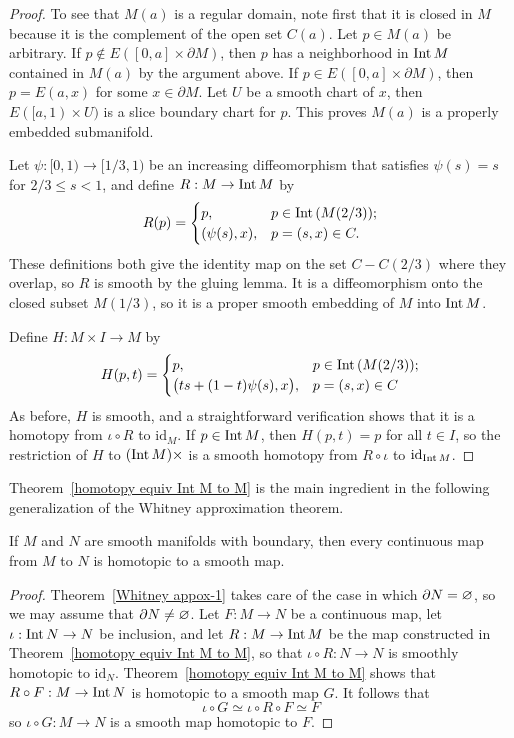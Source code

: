 \begin{proof}
To see that $M(a)$ is a regular domain, note first that it is closed in $M$ because it is the complement of the open set $C(a)$. Let $p\in M(a)$ be arbitrary. If $p\notin E([0,a]\times\partial M)$, then $p$ has a neighborhood in $\mathrm{Int}\, M$ contained in $M(a)$ by the argument above. If $p\in E([0,a]\times\partial M)$, then $p=E(a,x)$ for some $x\in\partial M$. Let $U$ be  a smooth chart of $x$, then $E([a,1)\times U)$ is a slice boundary chart for $p$. This proves $M(a)$ is a properly embedded submanifold.\par
Let $\psi:[0,1)\to [1/3,1)$ be an increasing diffeomorphism that satisfies $\psi(s)=s$ for $2/3\leq s<1$, and define $R:M\to\mathrm{Int}\, M$ by
\[R(p)=\begin{cases}
p,&p\in\mathrm{Int}\,(M(2/3));\\
(\psi(s),x),&p=(s,x)\in C.
\end{cases}\]
These definitions both give the identity map on the set $C-C(2/3)$ where they overlap, so $R$ is smooth by the gluing lemma. It is a diffeomorphism onto the closed subset $M(1/3)$, so it is a proper smooth embedding of $M$ into $\mathrm{Int}\, M$.\par
Define $H:M\times I\to M$ by
\[H(p,t)=\begin{cases}
p,&p\in\mathrm{Int}\,(M(2/3));\\
\big(ts+(1-t)\psi(s),x\big),&p=(s,x)\in C
\end{cases}\]
As before, $H$ is smooth, and a straightforward verification shows that it is a homotopy from $\iota\circ R$ to $\mathrm{id}_M$. If $p\in\mathrm{Int}\, M$, then $H(p,t)=p$ for all $t\in I$, so the restriction of $H$ to $(\mathrm{Int}\, M)\times $ is a smooth homotopy from $R\circ\iota$ to $\mathrm{id}_{\mathrm{Int}\, M}$.
\end{proof}
Theorem~\ref{homotopy equiv Int M to M} is the main ingredient in the following generalization of the Whitney approximation theorem.
\begin{theorem}
If $M$ and $N$ are smooth manifolds with boundary, then every continuous map from $M$ to $N$ is homotopic to a smooth map.
\end{theorem}
\begin{proof}
Theorem~\ref{Whitney appox-1} takes care of the case in which $\partial N=\varnothing$, so we may assume that $\partial N\neq\varnothing$. Let $F:M\to N$ be a continuous map, let $\iota:\mathrm{Int}\, N\to N$ be inclusion, and let $R:M\to\mathrm{Int}\, M$ be the map constructed in Theorem~\ref{homotopy equiv Int M to M}, so that $\iota\circ R:N\to N$ is smoothly homotopic to $\mathrm{id}_N$. Theorem~\ref{homotopy equiv Int M to M} shows that $R\circ F:M\to\mathrm{Int}\, N$ is homotopic to a smooth map $G$. It follows that 
\[\iota\circ G\simeq \iota\circ R\circ F\simeq F\]
so $\iota\circ G:M\to N$ is a smooth map homotopic to $F$.
\end{proof}

